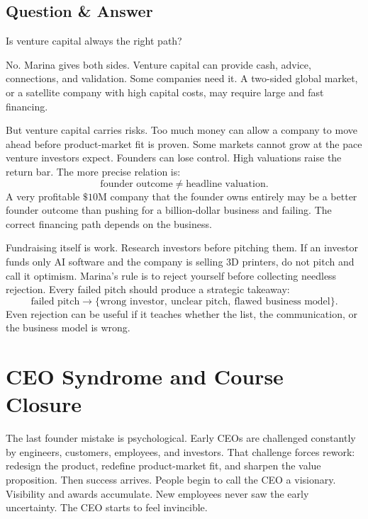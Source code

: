 \subsection{Question \& Answer}

Is venture capital always the right path?

No. Marina gives both sides. Venture capital can provide cash, advice, connections, and validation. Some companies need it. A two-sided global market, or a satellite company with high capital costs, may require large and fast financing.

But venture capital carries risks. Too much money can allow a company to move ahead before product-market fit is proven. Some markets cannot grow at the pace venture investors expect. Founders can lose control. High valuations raise the return bar. The more precise relation is:
\begin{equation}
\text{founder outcome}
\neq
\text{headline valuation}.
\end{equation}
A very profitable \(\$10\text{M}\) company that the founder owns entirely may be a better founder outcome than pushing for a billion-dollar business and failing. The correct financing path depends on the business.

Fundraising itself is work. Research investors before pitching them. If an investor funds only AI software and the company is selling 3D printers, do not pitch and call it optimism. Marina's rule is to reject yourself before collecting needless rejection. Every failed pitch should produce a strategic takeaway:
\begin{equation}
\text{failed pitch}
\longrightarrow
\{\text{wrong investor},\ \text{unclear pitch},\ \text{flawed business model}\}.
\end{equation}
Even rejection can be useful if it teaches whether the list, the communication, or the business model is wrong.

\section{CEO Syndrome and Course Closure}

The last founder mistake is psychological. Early CEOs are challenged constantly by engineers, customers, employees, and investors. That challenge forces rework: redesign the product, redefine product-market fit, and sharpen the value proposition. Then success arrives. People begin to call the CEO a visionary. Visibility and awards accumulate. New employees never saw the early uncertainty. The CEO starts to feel invincible.


